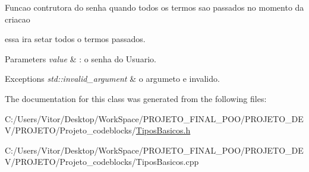 Funcao contrutora do senha quando todos os termos sao passados no momento da criacao \par
 essa ira setar todos o termos passados. 


\begin{DoxyParams}{Parameters}
{\em value} & \-: o senha do Usuario. \\
\hline
\end{DoxyParams}

\begin{DoxyExceptions}{Exceptions}
{\em std\-::invalid\-\_\-argument} & o argumeto e invalido. \\
\hline
\end{DoxyExceptions}


The documentation for this class was generated from the following files\-:\begin{DoxyCompactItemize}
\item 
C\-:/\-Users/\-Vitor/\-Desktop/\-Work\-Space/\-P\-R\-O\-J\-E\-T\-O\-\_\-\-F\-I\-N\-A\-L\-\_\-\-P\-O\-O/\-P\-R\-O\-J\-E\-T\-O\-\_\-\-D\-E\-V/\-P\-R\-O\-J\-E\-T\-O/\-Projeto\-\_\-codeblocks/\hyperlink{_tipos_basicos_8h}{Tipos\-Basicos.\-h}\item 
C\-:/\-Users/\-Vitor/\-Desktop/\-Work\-Space/\-P\-R\-O\-J\-E\-T\-O\-\_\-\-F\-I\-N\-A\-L\-\_\-\-P\-O\-O/\-P\-R\-O\-J\-E\-T\-O\-\_\-\-D\-E\-V/\-P\-R\-O\-J\-E\-T\-O/\-Projeto\-\_\-codeblocks/Tipos\-Basicos.\-cpp\end{DoxyCompactItemize}
